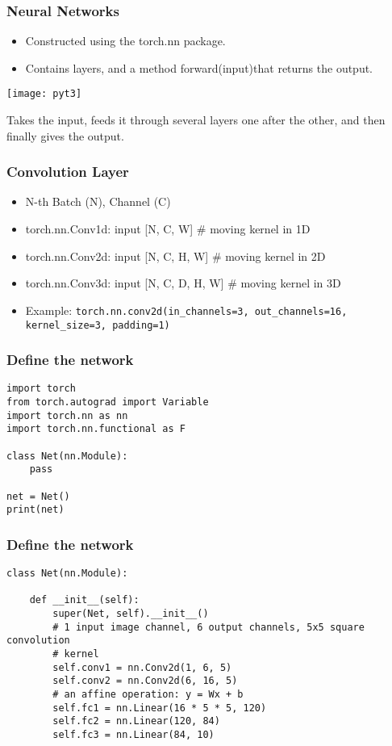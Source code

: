 \begin{frame}[fragile] \frametitle{Neural Networks}
\begin{itemize}
\item Constructed using the torch.nn package.
\item Contains layers, and a method forward(input)that returns the output.
\end{itemize}
\begin{center}
\texttt{[image: pyt3]}
\end{center}
Takes the input, feeds it through several layers one after the other, and then finally gives the output.
\end{frame}

\begin{frame}[fragile] \frametitle{Convolution Layer}
\begin{itemize}
\item N-th Batch (N), Channel (C)
\item torch.nn.Conv1d: input [N, C, W] \# moving kernel in 1D
\item torch.nn.Conv2d: input [N, C, H, W] \# moving kernel in 2D
\item torch.nn.Conv3d: input [N, C, D, H, W] \# moving kernel in 3D
\item Example: \lstinline|torch.nn.conv2d(in_channels=3, out_channels=16, kernel_size=3, padding=1)|
\end{itemize}
\end{frame}

\begin{frame}[fragile] \frametitle{Define the network}
\begin{lstlisting}
import torch
from torch.autograd import Variable
import torch.nn as nn
import torch.nn.functional as F

class Net(nn.Module):
	pass
	
net = Net()
print(net)
\end{lstlisting}
\end{frame}

\begin{frame}[fragile] \frametitle{Define the network}
\begin{lstlisting}
class Net(nn.Module):

    def __init__(self):
        super(Net, self).__init__()
        # 1 input image channel, 6 output channels, 5x5 square convolution
        # kernel
        self.conv1 = nn.Conv2d(1, 6, 5)
        self.conv2 = nn.Conv2d(6, 16, 5)
        # an affine operation: y = Wx + b
        self.fc1 = nn.Linear(16 * 5 * 5, 120)
        self.fc2 = nn.Linear(120, 84)
        self.fc3 = nn.Linear(84, 10)
\end{lstlisting}
\end{frame}




